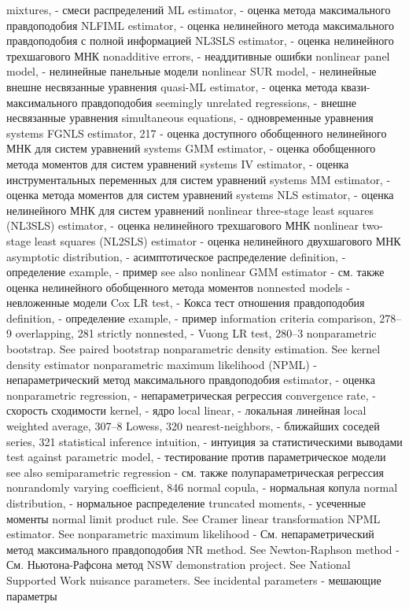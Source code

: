 mixtures, - смеси распределений
ML estimator, - оценка метода максимального правдоподобия
NLFIML estimator, - оценка нелинейного метода максимального правдоподобия с полной информацией
NL3SLS estimator, - оценка нелинейного трехшагового МНК
nonadditive errors, - неаддитивные ошибки
nonlinear panel model, - нелинейные панельные модели
nonlinear SUR model, - нелинейные внешне несвязанные уравнения
quasi-ML estimator, - оценка метода квази-максимального правдоподобия
seemingly unrelated regressions, - внешне несвязанные уравнения
simultaneous equations, - одновременные уравнения
systems FGNLS estimator, 217 - оценка доступного обобщенного нелинейного МНК для систем уравнений
systems GMM estimator, - оценка обобщенного метода моментов для систем уравнений 
systems IV estimator, - оценка инструментальных переменных для систем уравнений
systems MM estimator, - оценка метода моментов для систем уравнений
systems NLS estimator, - оценка нелинейного МНК для систем уравнений
nonlinear three-stage least squares (NL3SLS) estimator, - оценка нелинейного трехшагового МНК 
nonlinear two-stage least squares (NL2SLS) estimator - оценка нелинейного двухшагового МНК
asymptotic distribution, - асимптотическое распределение
definition, - определение
example, - пример
see also nonlinear GMM estimator  - см. также оценка нелинейного обобщенного метода моментов
nonnested models - невложенные модели
Cox LR test, - Кокса тест отношения правдоподобия
definition, - определение
example, - пример
information criteria comparison, 278–9 
overlapping, 281
strictly nonnested, - 
Vuong LR test, 280–3
nonparametric bootstrap. See paired bootstrap nonparametric density estimation. See kernel density
estimator
nonparametric maximum likelihood (NPML) - непараметрический метод максимального правдоподобия
estimator, - оценка
nonparametric regression, - непараметрическая регрессия
convergence rate, - схорость сходимости
kernel, - ядро
local linear, - локальная линейная
local weighted average, 307–8 
Lowess, 320
nearest-neighbors, - ближайших соседей
series, 321
statistical inference intuition, - интуиция за статистическими выводами
test against parametric model, - тестирование против параметрическое модели
see also semiparametric regression - см. также полупараметрическая регрессия
nonrandomly varying coefficient, 846 
normal copula, - нормальная копула
normal distribution, - нормальное распределение
truncated moments, - усеченные моменты
normal limit product rule. See Cramer linear
transformation
NPML estimator. See nonparametric maximum likelihood - См. непараметрический метод максимального правдоподобия
NR method. See Newton-Raphson method - См. Ньютона-Рафсона метод
NSW demonstration project. See National Supported
Work
nuisance parameters. See incidental parameters - мешающие параметры

